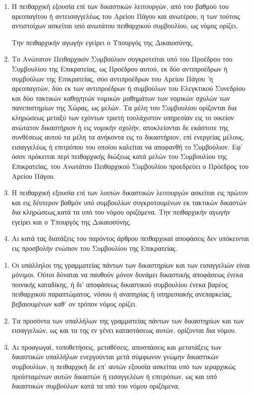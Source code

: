 \documentclass[twoside, a4paper, 10pt]{article}
\begin{document}
\begin{multicols}{2}
\begin{enumerate}
\begin{BigQuote}
\begin{enumerate}
  \item[1.] Η πειθαρχική εξουσία επί των δικαστικών λειτουργών, από του βαθμού του αρεοπαγίτου ή αντεισαγγελέως του Αρείου Πάγου και ανωτέρου, η των τούτοις αντιστοίχων ασκείται υπό ανωτάτου πειθαρχικού συμβουλίου, ως νόμος ορίζει.

	Την πειθαρχικήν  αγωγήν εγείρει ο Υπουργός της Δικαιοσύνης.
  \item[2.] Το Ανώτατον Πειθαρχικόν Συμβούλιον  συγκροτείται υπό του Προέδρου του Συμβουλίου της Επικρατείας, ως Προέδρου αυτού, εκ δύο αντιπροέδρων ή συμβούλων της Επικρατείας, σύο αντιπροέδρων του Αρείου Πάγου 'η αρεοπαγιτών, δύο εκ των αντιπροέδρων ή συμβούλων του Ελεγκτικού Συνεδρίου και δύο τακτικών καθηγητών νομικών μαθημάτων των νομικών σχολών των πανεπιστημίων της Χώρας, ως μελών. Τα μέλη του Συμβουλίου ορίζονται δια κληρώσεως  μεταξύ των εχόντων τριετή τουλάχιστον υπηρεσίαν εις το οικείον ανώτατον δικαστήριον ή εις νομικήν σχολήν, αποκλείονται δε εκάστοτε της συνθέσεως αυτού τα μέλη τα ανήκοντα εις το δικαστήριον, επί ενεργείας μέλους, εισαγγελέως ή επιτρόπου του οποίου καλείται να αποφανθή το Συμβούλιον. Εφ' όσον πρόκειται περί πειθαρχικής διώξεως κατά μελών του Συμβουλίου της Επικρατείας, του Ανωτάτου Πειθαρχικού Συμβουλίου προεδρεύει ο Πρόεδρος του Αρείου Πάγου.
  \item[3.] Η πειθαρχική εξουσία επί των λοιπών δικαστικών λειτουργών ασκείται εις πρώτον και εις δέυτερον βαθμόν υπό συμβουλίων συγκροτουμένων εκ τακτικών δικαστών δια κληρώσεως,κατά τα υπό του νόμου οριζόμενα. Την πειθαρχικήν αγωγήν εγείρει και ο Υπουργός της Δικαιοσύνης.
  \item[4.] Αι κατά τας διατάξεις του παρόντος άρθρου πειθαρχικαί αποφάσεις δεν υπόκεινται εις προσβολήν ενώπιον του Συμβουλίου της Επικρατείας.
\end{enumerate}

\begin{enumerate}
  \item[1.] Οι υπάλληλοι της γραμματείας πάντων των δικαστηρίων και των εισαγγελιών είναι μόνιμοι. Ούτοι δύναται να παυθούν μόνον δυνάμει δικαστικής αποφάσεως ένεκα ποινικής καταδίκης, ή δι' αποφάσεως δικαστικού συμβουλίου ένεκα βαρέος πειθαρχικού παραπτώματος, νόσου ή αναπηρίας ή υπηρεσιακής ανεπαρκείας, βεβαιουμένων καθ' ον τρόπον νόμος ορίζει.
  \item[2.] Τα προσόντα των υπαλλήλων της γραμματείας πάντων των δικαστηρίων και των εισαγγελιών, ως και τα της εν γένει καταστάσεως αυτών, ορίζονται δια νόμου.
  \item[3.] Αι προαγωγαί, τοποθετήσεις, μεταθέσεις, αποσπάσεις και μετατάξεις των δικαστικών υπαλλήλων ενεργούνται μετά σύμφωνον γνώμην δικαστικών συμβουλίων, η πειθαρχική δε επ' αυτών εξουσία ασκείται υπό των ιεραρχικώς  προϊσταμένων αυτών δικαστών ή εισαγγελέων ή επιτρόπων, ως και υπό δικαστικών συμβούλων κατά τα υπό του νόμου οριζόμενα,


\end{enumerate}
\end{BigQuote}
\end{enumerate}
\end{multicols}
\end{document}
